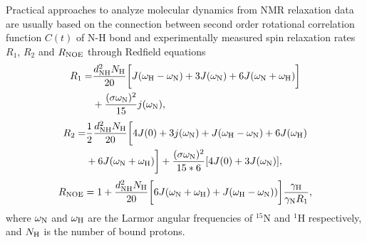 \documentclass[pre,aps,floatfix,authordate1-4,twocolumn]{revtex4-1}
\begin{document}
Practical approaches to analyze molecular dynamics from
NMR relaxation data are usually based on the connection between
second order rotational correlation function $C(t)$ of N-H bond
and experimentally measured spin relaxation rates $R_1$, $R_2$
and $R_{\rm NOE}$ through Redfield equations \cite{abragam,kay89}
\begin{equation}\label{R1}
  \begin{aligned}
  R_{1}= & \frac{d_{\rm{NH}}^2N_{\rm{H}}}{20}\bigg[J(\omega_{\rm{H}}-\omega_{\rm{N}})+3J(\omega_{\rm{N}})+6J(\omega_{\rm{N}}+\omega_{\rm{H}})\bigg] \\
        & +\frac{(\sigma \omega_{\rm{N}})^2}{15}j(\omega_{\rm{N}}),
  \end{aligned}
\end{equation}
\begin{equation}\label{R2}
    \begin{aligned}
  R_{2}= & \frac{1}{2}\frac{d_{\rm{NH}}^2N_{\rm{H}}}{20}\bigg[4J(0)+3j(\omega_{\rm{N}})+J(\omega_{\rm{H}}-\omega_{\rm{N}})+6J(\omega_{\rm{H}})  \\
    & +6J(\omega_{\rm{N}}+\omega_{\rm{H}})\bigg]+\frac{(\sigma \omega_{\rm{N}})^2}{15*6}[4J(0) +3J(\omega_{\rm{N}})],
    \end{aligned}
\end{equation}
\begin{equation}\label{NOE}
R_{\rm NOE}=1+\frac{d_{\rm{NH}}^2N_{\rm{H}}}{20}\bigg[6J(\omega_{\rm{N}}+\omega_{\rm{H}})+J(\omega_{\rm{H}}-\omega_{\rm{N}}))\bigg]\frac{\gamma_{\rm{H}}}{\gamma_{\rm{N}}R_1},
\end{equation}
where $\omega_{\rm{N}}$ and $\omega_{\rm{H}}$ are the Larmor angular
frequencies of $^{15}$N and $^1$H respectively, and
$N_{\rm{H}}$ is the number of bound protons.
\end{document}
